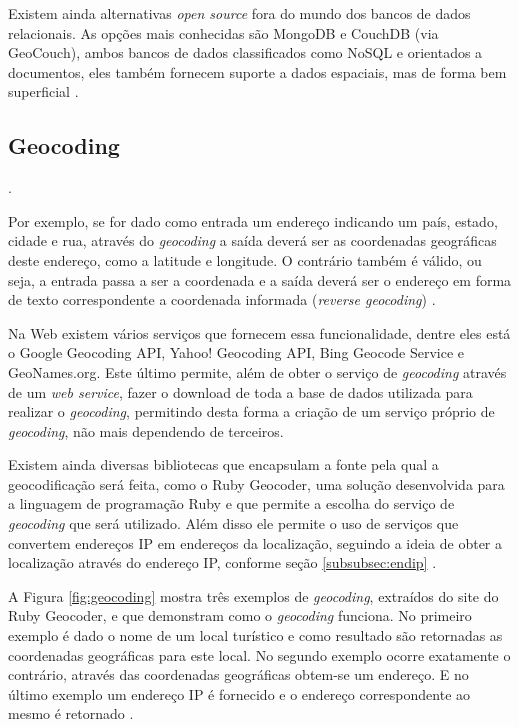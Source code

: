 \documentclass[diss]{template/setrem}
\begin{document}
Existem ainda alternativas \emph{open source} fora do mundo dos bancos de dados relacionais. As opções mais conhecidas são MongoDB e CouchDB (via GeoCouch), ambos bancos de dados classificados como NoSQL e orientados a documentos, eles também fornecem suporte a dados espaciais, mas de forma bem superficial \citep{Steiniger2009}.

\subsection{Geocoding}
\label{subsec:geocoding}
\citep[p. 7]{Holdener2011}.

Por exemplo, se for dado como entrada um endereço indicando um país, estado, cidade e rua, através do \emph{geocoding} a saída deverá ser as coordenadas geográficas deste endereço, como a latitude e longitude. O contrário também é válido, ou seja, a entrada passa a ser a coordenada e a saída deverá ser o endereço em forma de texto correspondente a coordenada informada (\emph{reverse geocoding}) \citep{Holdener2011}.

Na Web existem vários serviços que fornecem essa funcionalidade, dentre eles está o Google Geocoding API, Yahoo! Geocoding API, Bing Geocode Service e GeoNames.org. Este último permite, além de obter o serviço de \emph{geocoding} através de um \emph{web service}, fazer o download de toda a base de dados utilizada para realizar o \emph{geocoding}, permitindo desta forma a criação de um serviço próprio de \emph{geocoding}, não mais dependendo de terceiros.

Existem ainda diversas bibliotecas que encapsulam a fonte pela qual a geocodificação será feita, como o Ruby Geocoder, uma solução desenvolvida para a linguagem de programação Ruby e que permite a escolha do serviço de \emph{geocoding} que será utilizado. Além disso ele permite o uso de serviços que convertem endereços IP em endereços da localização, seguindo a ideia de obter a localização através do endereço IP, conforme seção \ref{subsubsec:endip} \citep{RubyGeocoder2012}.

A Figura \ref{fig:geocoding} mostra três exemplos de \emph{geocoding}, extraídos do site do Ruby Geocoder, e que demonstram como o \emph{geocoding} funciona. No primeiro exemplo é dado o nome de um local turístico e como resultado são retornadas as coordenadas geográficas para este local. No segundo exemplo ocorre exatamente o contrário, através das coordenadas geográficas obtem-se um endereço. E no último exemplo um endereço IP é fornecido e o endereço correspondente ao mesmo é retornado \citep{RubyGeocoder2012}.
\end{document}
